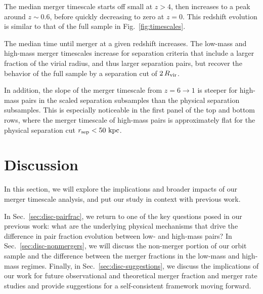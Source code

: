 \documentclass[twocolumn,linenumbers]{aastex631}
\begin{document}
        The median merger timescale starts off small at $z>4$, then increases to a peak around $z\sim0.6$, before quickly decreasing to zero at $z=0$. 
        This redshift evolution is similar to that of the full sample in Fig.~\ref{fig:timescales}.
        
        The median time until merger at a given redshift increases.
        The low-mass and high-mass merger timescales increase for separation criteria that include a larger fraction of the virial radius, and thus larger separation pairs, but recover the behavior of the full sample by a separation cut of $2\,R_{\mathrm{vir}}$.
        
        In addition, the slope of the merger timescale from $z=6\to1$ is steeper for high-mass pairs in the scaled separation subsamples than the physical separation subsamples.
        This is especially noticeable in the first panel of the top and bottom rows, where the merger timescale of high-mass pairs is approximately flat for the physical separation cut $r_{\mathrm{sep}}<50\,\mathrm{\,kpc}$. 

\section{Discussion} \label{sec:discussion}
    In this section, we will explore the implications and broader impacts of our merger timescale analysis, and put our study in context with previous work. 

    In Sec.~\ref{sec:disc-pairfrac}, we return to one of the key questions posed in our previous work: what are the underlying physical mechanisms that drive the difference in pair fraction evolution between low- and high-mass pairs? 
    In Sec.~\ref{sec:disc-nonmergers}, we will discuss the non-merger portion of our orbit sample and the difference between the merger fractions in the low-mass and high-mass regimes.
    Finally, in Sec.~\ref{sec:disc-suggestions}, we discuss the implications of our work for future observational and theoretical merger fraction and merger rate studies and provide suggestions for a self-consistent framework moving forward.
\end{document}
